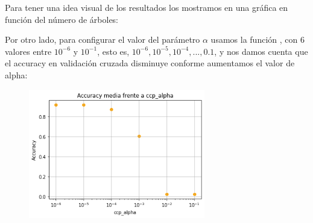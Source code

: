 \documentclass[a4]{article}
\begin{document}
Para tener una idea visual de los resultados los mostramos en una gráfica en función del número de árboles: 

\begin{figure}[H]
	\label{fig:num_arboles}
\end{figure}

Por otro lado, para configurar el valor del parámetro $\alpha$ usamos la función , con 6 valores entre $10^{-6}$ y $10^{-1}$, esto es, $10^{-6}, 10^{-5}, 10^{-4},...,0.1$, y nos damos cuenta que el accuracy en validación cruzada disminuye conforme aumentamos el valor de alpha:

\begin{figure}[H]
    \centering
    \includegraphics[width=77mm]{img/rf_alpha.png}
	\label{fig:ccp_alpha}
\end{figure}
\end{document}
